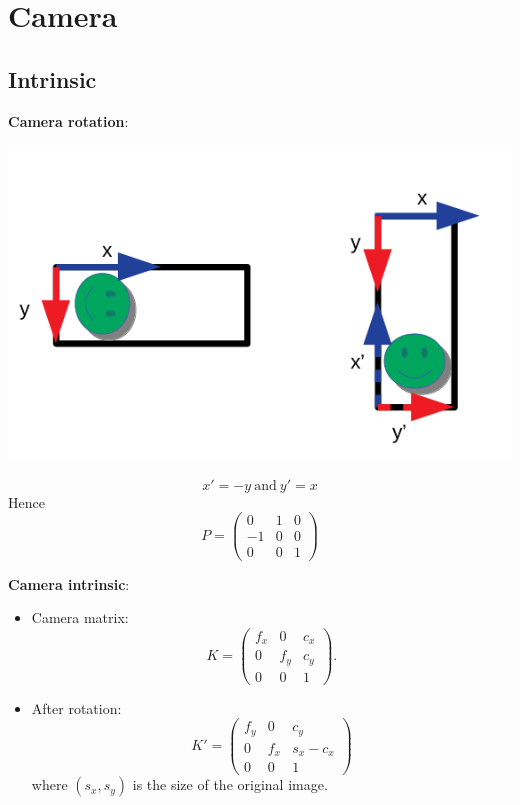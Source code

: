 \documentclass{beamer}
\begin{document}
\section{Camera}

\subsection{Intrinsic}
\begin{frame}
\textbf{Camera rotation}:
\begin{center}
\includegraphics[scale=0.3]{Pictures/CameraVerticalRotation.png}
\end{center}
\begin{equation}
x' = -y ~\text{and}~ y' = x
\end{equation}
Hence
\begin{equation}
P = \left(
\begin{array}{ccc}
0 & 1 & 0 \\
-1 & 0 & 0 \\
0 & 0 & 1
\end{array}
\right)
\end{equation}
\end{frame}

\begin{frame}
\textbf{Camera intrinsic}:
\begin{itemize}
\item Camera matrix:
\begin{equation}
K = \left(
\begin{array}{ccc}
f_x & 0 & c_x \\
0 & f_y & c_y \\
0 & 0 & 1
\end{array}
\right).
\end{equation}
\item 
After rotation:
\begin{equation}
K' = \left(
\begin{array}{ccc}
f_y & 0 & c_y \\
0 & f_x & s_x - c_x \\
0 & 0 & 1
\end{array}
\right) 
\end{equation}
where $(s_x,s_y)$ is the size of the original image.
\end{itemize}
\end{frame}
\end{document}
